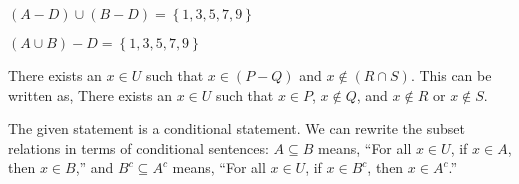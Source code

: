 \begin{list}{}
\item \begin{list}{\textbf{(m)}}
\item $\left( {A - D} \right) \cup \left( {B - D} \right) = \left\{ 1, 3, 5, 7, 9 \right\}$
\end{list}
\end{list}

\begin{list}{}
\item \begin{list}{\textbf{(n)}}
\item $\left( {A \cup B} \right) - D = \left\{ 1, 3, 5, 7, 9 \right\}$
\end{list}
\end{list}



\begin{list}{\bf{\ref{exer:sec41-4sets}.}}
\item \begin{list}{\bf{(b)}}
\item There exists an $x \in U$ such that $x \in (P - Q)$ and 
$x \notin (R \cap S)$.  This can be written as,  There exists an $x \in U$ such that 
$x \in P$, $x \notin Q$, and $x \notin R$ or $x \notin S$.
\end{list}
\end{list}


\begin{list}{\bf{\ref{exer:sec41-10}.}}
\item \begin{list}{\bf{(a)}}
\item The given statement is a conditional statement.  We can rewrite the subset relations in terms of conditional sentences:  $A \subseteq B$ means, ``For all $x \in U$, if $x \in A$, then 
$x \in B$,'' and $B^c \subseteq A^c$ means, ``For all $x \in U$, if $x \in B^c$, then 
$x \in A^c$.''
\end{list}
\end{list}

%
\hbreak
\renewcommand{\labelenumi}{\textbf{\arabic{enumi}.}}

\endinput

